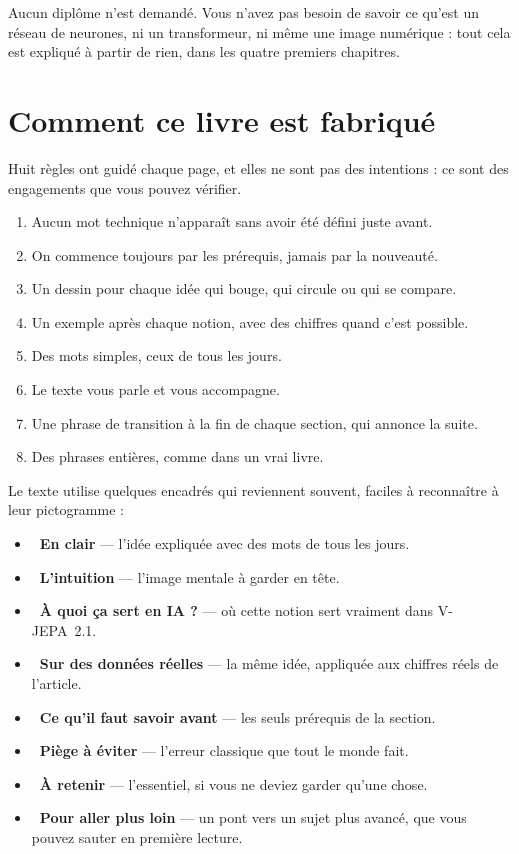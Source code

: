 Aucun diplôme n'est demandé. Vous n'avez pas besoin de savoir ce qu'est un
réseau de neurones, ni un transformeur, ni même une image numérique : tout
cela est expliqué à partir de rien, dans les quatre premiers chapitres.

\section*{Comment ce livre est fabriqué}

Huit règles ont guidé chaque page, et elles ne sont pas des intentions : ce
sont des engagements que vous pouvez vérifier.

\begin{enumerate}
  \item Aucun mot technique n'apparaît sans avoir été défini juste avant.
  \item On commence toujours par les prérequis, jamais par la nouveauté.
  \item Un dessin pour chaque idée qui bouge, qui circule ou qui se compare.
  \item Un exemple après chaque notion, avec des chiffres quand c'est
        possible.
  \item Des mots simples, ceux de tous les jours.
  \item Le texte vous parle et vous accompagne.
  \item Une phrase de transition à la fin de chaque section, qui annonce la
        suite.
  \item Des phrases entières, comme dans un vrai livre.
\end{enumerate}

Le texte utilise quelques encadrés qui reviennent souvent, faciles à
reconnaître à leur pictogramme :

\begin{itemize}
  \item \textbf{~En clair} — l'idée expliquée avec des
        mots de tous les jours.
  \item \textbf{~L'intuition} — l'image mentale à garder en
        tête.
  \item \textbf{~À quoi ça sert en IA ?} — où cette notion
        sert vraiment dans V-JEPA~2.1.
  \item \textbf{~Sur des données réelles} — la même idée,
        appliquée aux chiffres réels de l'article.
  \item \textbf{~Ce qu'il faut savoir avant} — les seuls
        prérequis de la section.
  \item \textbf{~Piège à éviter} — l'erreur
        classique que tout le monde fait.
  \item \textbf{~À retenir} — l'essentiel, si vous ne deviez
        garder qu'une chose.
  \item \textbf{~Pour aller plus loin} — un pont vers un
        sujet plus avancé, que vous pouvez sauter en première lecture.
\end{itemize}

